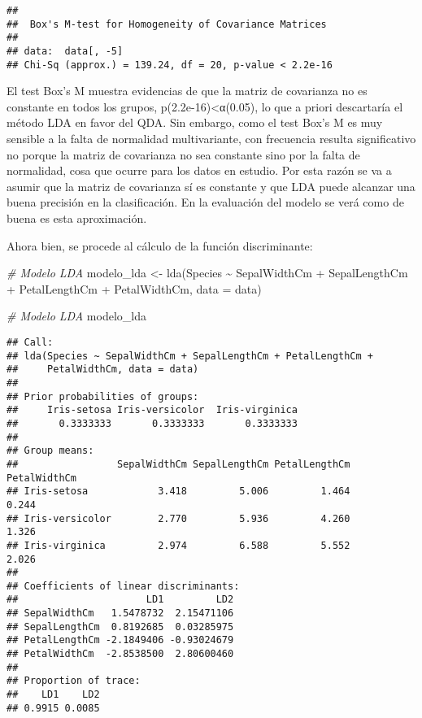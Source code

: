 \documentclass[
]{article}
\newenvironment{Shaded}{\begin{snugshade}}{\end{snugshade}}
\newcommand{\AttributeTok}[1]{\textcolor[rgb]{0.77,0.63,0.00}{#1}}
\newcommand{\CommentTok}[1]{\textcolor[rgb]{0.56,0.35,0.01}{\textit{#1}}}
\newcommand{\FunctionTok}[1]{\textcolor[rgb]{0.00,0.00,0.00}{#1}}
\newcommand{\NormalTok}[1]{#1}
\newcommand{\OtherTok}[1]{\textcolor[rgb]{0.56,0.35,0.01}{#1}}
\newcommand{\SpecialCharTok}[1]{\textcolor[rgb]{0.00,0.00,0.00}{#1}}
\begin{document}
\begin{verbatim}
## 
##  Box's M-test for Homogeneity of Covariance Matrices
## 
## data:  data[, -5]
## Chi-Sq (approx.) = 139.24, df = 20, p-value < 2.2e-16
\end{verbatim}

El test Box's M muestra evidencias de que la matriz de covarianza no es
constante en todos los grupos, p(2.2e-16)\textless α(0.05), lo que a
priori descartaría el método LDA en favor del QDA. Sin embargo, como el
test Box's M es muy sensible a la falta de normalidad multivariante, con
frecuencia resulta significativo no porque la matriz de covarianza no
sea constante sino por la falta de normalidad, cosa que ocurre para los
datos en estudio. Por esta razón se va a asumir que la matriz de
covarianza sí es constante y que LDA puede alcanzar una buena precisión
en la clasificación. En la evaluación del modelo se verá como de buena
es esta aproximación.

Ahora bien, se procede al cálculo de la función discriminante:

\begin{Shaded}
\begin{Highlighting}[]
\CommentTok{\# Modelo LDA}
\NormalTok{modelo\_lda }\OtherTok{\textless{}{-}} \FunctionTok{lda}\NormalTok{(Species }\SpecialCharTok{\textasciitilde{}}\NormalTok{ SepalWidthCm }\SpecialCharTok{+}\NormalTok{ SepalLengthCm }\SpecialCharTok{+}\NormalTok{ PetalLengthCm }\SpecialCharTok{+}
\NormalTok{                    PetalWidthCm, }\AttributeTok{data =}\NormalTok{ data)}
\end{Highlighting}
\end{Shaded}

\begin{Shaded}
\begin{Highlighting}[]
\CommentTok{\# Modelo LDA}
\NormalTok{modelo\_lda}
\end{Highlighting}
\end{Shaded}

\begin{verbatim}
## Call:
## lda(Species ~ SepalWidthCm + SepalLengthCm + PetalLengthCm + 
##     PetalWidthCm, data = data)
## 
## Prior probabilities of groups:
##     Iris-setosa Iris-versicolor  Iris-virginica 
##       0.3333333       0.3333333       0.3333333 
## 
## Group means:
##                 SepalWidthCm SepalLengthCm PetalLengthCm PetalWidthCm
## Iris-setosa            3.418         5.006         1.464        0.244
## Iris-versicolor        2.770         5.936         4.260        1.326
## Iris-virginica         2.974         6.588         5.552        2.026
## 
## Coefficients of linear discriminants:
##                      LD1         LD2
## SepalWidthCm   1.5478732  2.15471106
## SepalLengthCm  0.8192685  0.03285975
## PetalLengthCm -2.1849406 -0.93024679
## PetalWidthCm  -2.8538500  2.80600460
## 
## Proportion of trace:
##    LD1    LD2 
## 0.9915 0.0085
\end{verbatim}
\end{document}
